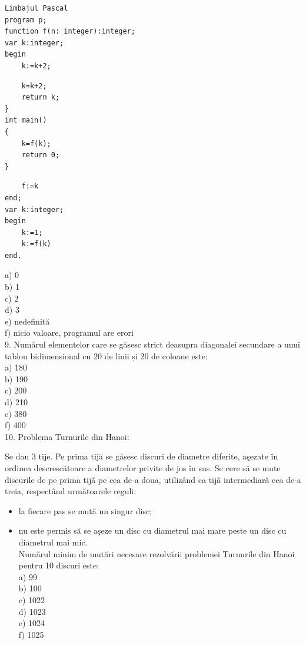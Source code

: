 \documentclass[10pt]{article}
\begin{document}
\begin{verbatim}
Limbajul Pascal
program p;
function f(n: integer):integer;
var k:integer;
begin
    k:=k+2;
\end{verbatim}

\begin{verbatim}
    k=k+2;
    return k;
}
int main()
{
    k=f(k);
    return 0;
}
\end{verbatim}

\begin{verbatim}
    f:=k
end;
var k:integer;
begin
    k:=1;
    k:=f(k)
end.
\end{verbatim}

a) 0\\
b) 1\\
c) 2\\
d) 3\\
e) nedefinită\\
f) nicio valoare, programul are erori\\
9. Numărul elementelor care se găsesc strict deasupra diagonalei secundare a unui tablou bidimensional cu 20 de linii și 20 de coloane este:\\
a) 180\\
b) 190\\
c) 200\\
d) 210\\
e) 380\\
f) 400\\
10. Problema Turnurile din Hanoi:

Se dau 3 tije. Pe prima tijă se găsesc discuri de diametre diferite, aşezate în ordinea descrescătoare a diametrelor privite de jos în sus. Se cere să se mute discurile de pe prima tijă pe cea de-a doua, utilizând ca tijă intermediară cea de-a treia, respectând următoarele reguli:

\begin{itemize}
  \item la fiecare pas se mută un singur disc;
  \item nu este permis să se aşeze un disc cu diametrul mai mare peste un disc cu diametrul mai mic.\\
Numărul minim de mutări necesare rezolvării problemei Turnurile din Hanoi pentru 10 discuri este:\\
a) 99\\
b) 100\\
c) 1022\\
d) 1023\\
e) 1024\\
f) 1025
\end{itemize}
\end{document}
